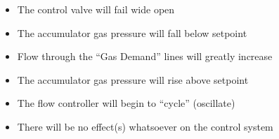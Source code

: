 \begin{itemize}
\item{} The control valve will fail wide open
\vskip 5pt 
\item{} The accumulator gas pressure will fall below setpoint
\vskip 5pt 
\item{} Flow through the ``Gas Demand'' lines will greatly increase
\vskip 5pt 
\item{} The accumulator gas pressure will rise above setpoint 
\vskip 5pt 
\item{} The flow controller will begin to ``cycle'' (oscillate)
\vskip 5pt 
\item{} There will be no effect(s) whatsoever on the control system
\end{itemize}




